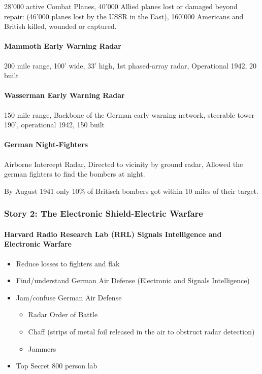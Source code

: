 28'000 active Combat Planes, 40'000 Allied planes lost or damaged beyond
repair: (46'000 planes lost by the USSR in the East), 160'000 Americans and
British killed, wounded or captured.

\paragraph{Mammoth Early Warning Radar}

200 mile range, 100' wide, 33' high, 1st phased-array radar, Operational 1942,
20 built

\paragraph{Wasserman Early Warning Radar}

150 mile range, Backbone of the German early warning network, steerable tower
190', operational 1942, 150 built

\paragraph{German Night-Fighters}

Airborne Intercept Radar, Directed to vicinity by ground radar, Allowed the
german fighters to find the bombers at night.

\vspace{1\baselineskip}

By August 1941 only 10\% of Britisch bombers got within 10 miles of their
target.

\subsubsection{Story 2: The Electronic Shield-Electric Warfare}

\paragraph{Harvard Radio Research Lab (RRL) Signals Intelligence and Electronic
Warfare}

\begin{itemize}
    \item Reduce losses to fighters and flak
    \item Find/understand German Air Defense (Electronic and Signals Intelligence)
    \item Jam/confuse German Air Defense
        \begin{itemize}
            \item Radar Order of Battle
            \item Chaff (strips of metal foil released in the air to obstruct
                radar detection)
            \item Jammers
        \end{itemize}
    \item Top Secret 800 person lab
\end{itemize}

